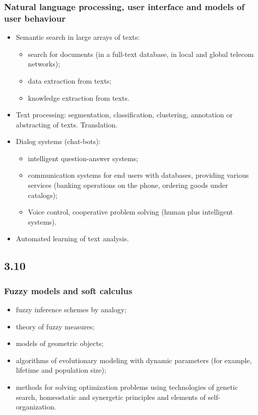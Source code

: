 \documentclass[default]{beamer}
\begin{document}
	\begin{frame}
		\frametitle{Natural language processing, user interface and models of user behaviour}
		\begin{itemize}
			\small
			\item Semantic search in large arrays of texts:
			\begin{itemize}
				\footnotesize
				\item search for documents (in a full-text database, in local and global telecom networks);
				\item data extraction from texts;
				\item knowledge extraction from texts.
			\end{itemize}
			
			\item Text processing: segmentation, classification, clustering, annotation or abstracting of texts. Translation.
			\item Dialog systems (chat-bots): 
			\begin{itemize}
				\footnotesize
				\item intelligent question-answer systems; 
				\item communication systems for end users with databases, providing various services (banking operations on the phone, ordering goods under catalogs); 
				\item Voice control, cooperative problem solving (human plus intelligent systems).
			\end{itemize}
			
			\item Automated learning of text analysis.
			
		\end{itemize}
		
	\end{frame}

	\subsection{3.10}
	\begin{frame}
		\frametitle{Fuzzy models and soft calculus}
		
		\Large 
		\begin{itemize}
			\item fuzzy inference schemes by analogy;
			\item theory of fuzzy measures;
			\item models of geometric objects;
			\item algorithms of evolutionary modeling with dynamic parameters (for example, lifetime and population size);
			\item methods for solving optimization problems using technologies of genetic search, homeostatic and synergetic principles and elements of self-organization.
		\end{itemize}
		
	\end{frame}
\end{document}

